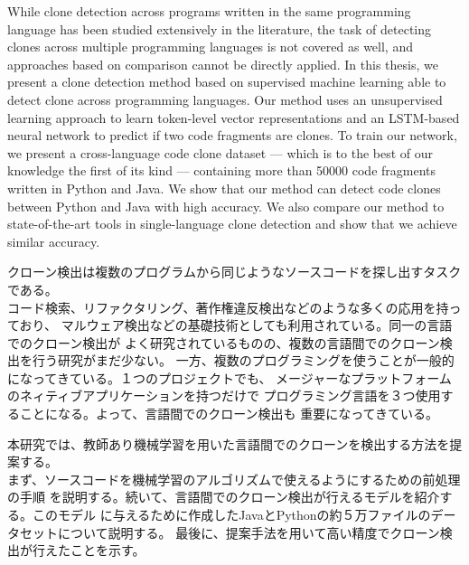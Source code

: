 \begin{eabstract}
While clone detection across programs written in the same programming language
has been studied extensively in the literature, the task of detecting clones
across multiple programming languages is not covered as well, and approaches
based on comparison cannot be directly applied.
In this thesis, we present a clone detection method based on supervised
machine learning able to detect clone across programming languages.
Our method uses an unsupervised learning approach to learn token-level vector
representations and an LSTM-based neural network to predict if two code
fragments are clones. To train our network, we present a cross-language code
clone dataset --- which is to the best of our knowledge the first of its kind
--- containing more than 50000 code fragments written in Python and Java.
We show that our method can detect code clones between Python and Java with high
accuracy. We also compare our method to state-of-the-art tools in
single-language clone detection and show that we achieve similar accuracy.
\end{eabstract}

\begin{jabstract}
クローン検出は複数のプログラムから同じようなソースコードを探し出すタスクである。\\
コード検索、リファクタリング、著作権違反検出などのような多くの応用を持っており、%
マルウェア検出などの基礎技術としても利用されている。同一の言語でのクローン検出が%
よく研究されているものの、複数の言語間でのクローン検出を行う研究がまだ少ない。%
一方、複数のプログラミングを使うことが一般的になってきている。１つのプロジェクトでも、%
メージャーなプラットフォームのネィティブアプリケーションを持つだけで%
プログラミング言語を３つ使用することになる。よって、言語間でのクローン検出も%
重要になってきている。

本研究では、教師あり機械学習を用いた言語間でのクローンを検出する方法を提案する。\\
まず、ソースコードを機械学習のアルゴリズムで使えるようにするための前処理の手順%
を説明する。続いて、言語間でのクローン検出が行えるモデルを紹介する。このモデル%
に与えるために作成したJavaとPythonの約５万ファイルのデータセットについて説明する。%
最後に、提案手法を用いて高い精度でクローン検出が行えたことを示す。
\end{jabstract}
